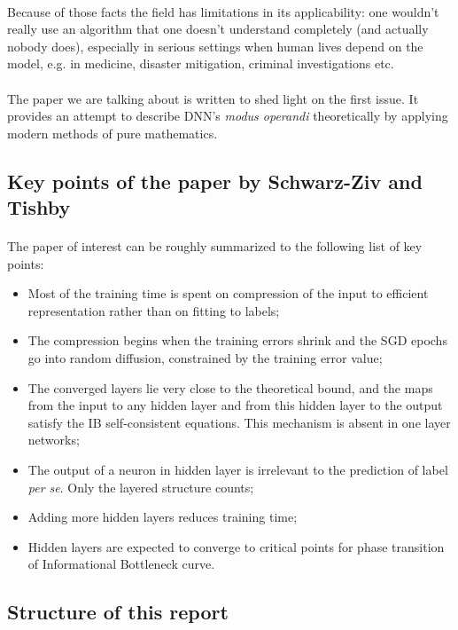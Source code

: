\documentclass[a4paper,14pt]{extarticle}
\begin{document}
\paragraph{}
Because of those facts the field has limitations in its applicability: one wouldn't really use an algorithm that one doesn't understand completely (and actually nobody does), especially in serious settings when human lives depend on the model, e.g. in medicine, disaster mitigation, criminal investigations etc. 
\paragraph{}
The paper we are talking about\cite{shwartz2017opening} is written to shed light on the first issue. It provides an attempt to describe DNN's \textit{modus operandi} theoretically by applying modern methods of pure mathematics.
\subsection{Key points of the paper by Schwarz-Ziv and Tishby}
\paragraph{}
The paper of interest\cite{shwartz2017opening} can be roughly summarized to the following list of key points:
\begin{itemize}
		\item Most of the training time is spent on compression of the input to efficient representation rather than on fitting to labels;
		\item The compression begins when the training errors shrink and the SGD epochs go into random diffusion, constrained by the training error value;
		\item The converged layers lie very close to the theoretical bound, and the maps from the input to any hidden layer and from this hidden layer to the output satisfy the IB self-consistent equations. This mechanism is absent in one layer networks;
		\item The output of a neuron in hidden layer is irrelevant to the prediction of label \textit{per se}. Only the layered structure counts;
		\item Adding more hidden layers reduces training time;
		\item Hidden layers are expected to converge to critical points for phase transition of Informational Bottleneck curve.
	\end{itemize}
\subsection{Structure of this report}
\end{document}
